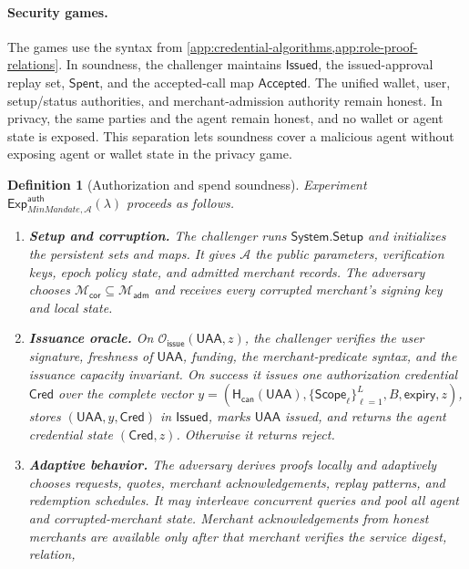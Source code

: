 \documentclass[letterpaper]{article}
\newcommand{\system}{MinMandate\xspace}
\newcommand{\adv}{\mathcal{A}}
\newcommand{\hash}{\mathsf{H}_{\mathsf{can}}}
\newtheorem{definition}{Definition}
\begin{document}
\paragraph{Security games.}

The games use the syntax from
\cref{app:credential-algorithms,app:role-proof-relations}. In soundness, the
challenger maintains \(\mathsf{Issued}\), the issued-approval replay set,
\(\mathsf{Spent}\), and the accepted-call map \(\mathsf{Accepted}\). The unified wallet, user,
setup/status authorities, and merchant-admission authority remain honest. In
privacy, the same parties and the agent remain honest, and no wallet or agent
state is exposed. This separation lets soundness cover a malicious agent
without exposing agent or wallet state in the privacy game.

\begin{definition}[Authorization and spend soundness]
\label{def:auth-soundness}
Experiment $\mathsf{Exp}^{\mathsf{auth}}_{\system,\adv}(\lambda)$ proceeds as follows.
\begin{enumerate}
  \item \textbf{Setup and corruption.} The challenger runs
  $\mathsf{System}.\mathsf{Setup}$ and initializes the persistent sets and
  maps. It gives $\adv$ the public parameters, verification keys, epoch policy
  state,
  and admitted merchant records. The adversary chooses
  \(\mathcal M_{\mathsf{cor}}\subseteq\mathcal M_{\mathsf{adm}}\) and receives
  every corrupted merchant's signing key and local state.
  \item \textbf{Issuance oracle.} On
  \(\mathcal O_{\mathsf{issue}}(\mathsf{UAA},z)\), the challenger
  verifies the user signature, freshness of \(\mathsf{UAA}\), funding, the
  merchant-predicate syntax, and the issuance capacity invariant. On success it
  issues one authorization credential \(\mathsf{Cred}\) over the complete
  vector
  \(y=(\hash(\mathsf{UAA}),\{\mathsf{Scope}_\ell\}_{\ell=1}^{L},
  B,\mathsf{expiry},z)\), stores
  \((\mathsf{UAA},y,\mathsf{Cred})\) in \(\mathsf{Issued}\), marks
  \(\mathsf{UAA}\) issued, and returns the agent credential state
  \((\mathsf{Cred},z)\). Otherwise it returns reject.
  \item \textbf{Adaptive behavior.} The adversary derives proofs locally and
  adaptively chooses requests, quotes, merchant acknowledgements, replay patterns, and
  redemption schedules. It may interleave concurrent queries and pool all
  agent and corrupted-merchant state. Merchant acknowledgements from honest merchants are
  available only after that merchant verifies the service digest, relation,

\end{enumerate}
\end{definition}
\end{document}
